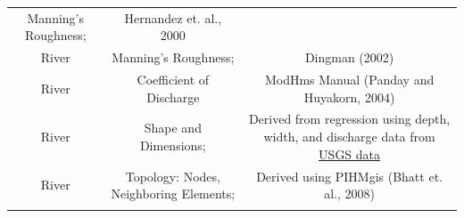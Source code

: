 \documentclass[]{scrbook}
\begin{document}
\begin{longtable}[]{@{}ccc@{}}
\begin{minipage}[t]{0.19\columnwidth}
Manning's Roughness;\strut
\end{minipage} & \begin{minipage}[t]{0.42\columnwidth}\centering\strut
Hernandez et. al., 2000\strut
\end{minipage}\tabularnewline
\begin{minipage}[t]{0.11\columnwidth}\centering\strut
River\strut
\end{minipage} & \begin{minipage}[t]{0.19\columnwidth}\centering\strut
Manning's Roughness;\strut
\end{minipage} & \begin{minipage}[t]{0.42\columnwidth}\centering\strut
Dingman (2002)\strut
\end{minipage}\tabularnewline
\begin{minipage}[t]{0.11\columnwidth}\centering\strut
River\strut
\end{minipage} & \begin{minipage}[t]{0.19\columnwidth}\centering\strut
Coefficient of Discharge\strut
\end{minipage} & \begin{minipage}[t]{0.42\columnwidth}\centering\strut
ModHms Manual (Panday and Huyakorn, 2004)\strut
\end{minipage}\tabularnewline
\begin{minipage}[t]{0.11\columnwidth}\centering\strut
River\strut
\end{minipage} & \begin{minipage}[t]{0.19\columnwidth}\centering\strut
Shape and Dimensions;\strut
\end{minipage} & \begin{minipage}[t]{0.42\columnwidth}\centering\strut
Derived from regression using depth, width, and discharge data from
\href{http://nwis.waterdata.usgs.gov/usa/nwis/measurements}{USGS
data}\strut
\end{minipage}\tabularnewline
\begin{minipage}[t]{0.11\columnwidth}\centering\strut
River\strut
\end{minipage} & \begin{minipage}[t]{0.19\columnwidth}\centering\strut
Topology: Nodes, Neighboring Elements;\strut
\end{minipage} & \begin{minipage}[t]{0.42\columnwidth}\centering\strut
Derived using PIHMgis (Bhatt et. al., 2008)\strut
\end{minipage}\tabularnewline
\begin{minipage}[t]{0.11\columnwidth}\centering\strut

\end{minipage}
\end{longtable}
\end{document}
